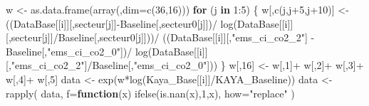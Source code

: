 \documentclass[
]{article}
\newenvironment{Shaded}{\begin{snugshade}}{\end{snugshade}}
\newcommand{\AttributeTok}[1]{\textcolor[rgb]{0.77,0.63,0.00}{#1}}
\newcommand{\ControlFlowTok}[1]{\textcolor[rgb]{0.13,0.29,0.53}{\textbf{#1}}}
\newcommand{\DecValTok}[1]{\textcolor[rgb]{0.00,0.00,0.81}{#1}}
\newcommand{\FunctionTok}[1]{\textcolor[rgb]{0.00,0.00,0.00}{#1}}
\newcommand{\NormalTok}[1]{#1}
\newcommand{\OtherTok}[1]{\textcolor[rgb]{0.56,0.35,0.01}{#1}}
\newcommand{\SpecialCharTok}[1]{\textcolor[rgb]{0.00,0.00,0.00}{#1}}
\newcommand{\StringTok}[1]{\textcolor[rgb]{0.31,0.60,0.02}{#1}}
\begin{document}
\begin{Shaded}
\begin{Highlighting}[]
\NormalTok{  w }\OtherTok{\textless{}{-}} \FunctionTok{as.data.frame}\NormalTok{(}\FunctionTok{array}\NormalTok{(,}\AttributeTok{dim=}\FunctionTok{c}\NormalTok{(}\DecValTok{36}\NormalTok{,}\DecValTok{16}\NormalTok{)))}
  \ControlFlowTok{for}\NormalTok{ (j }\ControlFlowTok{in} \DecValTok{1}\SpecialCharTok{:}\DecValTok{5}\NormalTok{) \{}
\NormalTok{  w[,}\FunctionTok{c}\NormalTok{(j,j}\SpecialCharTok{+}\DecValTok{5}\NormalTok{,j}\SpecialCharTok{+}\DecValTok{10}\NormalTok{)] }\OtherTok{\textless{}{-}}\NormalTok{ ((DataBase[[i]][,secteur[j]]}\SpecialCharTok{{-}}\NormalTok{Baseline[,secteur0[j]])}\SpecialCharTok{/}
          \FunctionTok{log}\NormalTok{(DataBase[[i]][,secteur[j]]}\SpecialCharTok{/}\NormalTok{Baseline[,secteur0[j]]))}\SpecialCharTok{/}
\NormalTok{     ((DataBase[[i]][,}\StringTok{"ems\_ci\_co2\_2"}\NormalTok{] }\SpecialCharTok{{-}}\NormalTok{ Baseline[,}\StringTok{"ems\_ci\_co2\_0"}\NormalTok{])}\SpecialCharTok{/}
       \FunctionTok{log}\NormalTok{(DataBase[[i]][,}\StringTok{"ems\_ci\_co2\_2"}\NormalTok{]}\SpecialCharTok{/}\NormalTok{Baseline[,}\StringTok{"ems\_ci\_co2\_0"}\NormalTok{]))}
\NormalTok{  \}}
\NormalTok{  w[,}\DecValTok{16}\NormalTok{] }\OtherTok{\textless{}{-}}\NormalTok{ w[,}\DecValTok{1}\NormalTok{]}\SpecialCharTok{+}\NormalTok{ w[,}\DecValTok{2}\NormalTok{]}\SpecialCharTok{+}\NormalTok{ w[,}\DecValTok{3}\NormalTok{]}\SpecialCharTok{+}\NormalTok{ w[,}\DecValTok{4}\NormalTok{]}\SpecialCharTok{+}\NormalTok{ w[,}\DecValTok{5}\NormalTok{]}
\NormalTok{  data }\OtherTok{\textless{}{-}} \FunctionTok{exp}\NormalTok{(w}\SpecialCharTok{*}\FunctionTok{log}\NormalTok{(Kaya\_Base[[i]]}\SpecialCharTok{/}\NormalTok{KAYA\_Baseline))}
\NormalTok{  data }\OtherTok{\textless{}{-}} \FunctionTok{rapply}\NormalTok{( data, }\AttributeTok{f=}\ControlFlowTok{function}\NormalTok{(x) }\FunctionTok{ifelse}\NormalTok{(}\FunctionTok{is.nan}\NormalTok{(x),}\DecValTok{1}\NormalTok{,x), }\AttributeTok{how=}\StringTok{"replace"}\NormalTok{ )}
  

\end{Highlighting}
\end{Shaded}
\end{document}
